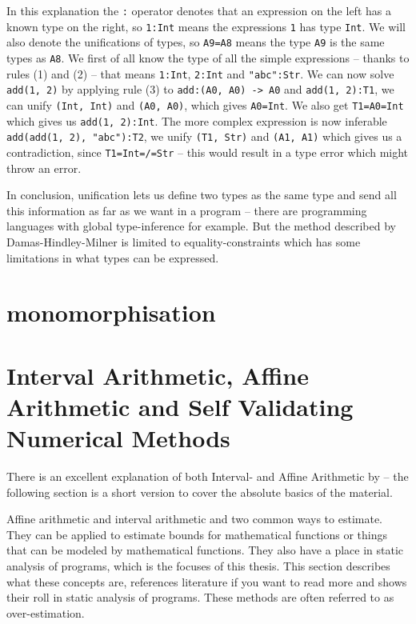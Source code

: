 In this explanation the \verb+:+ operator denotes that an expression on the left has a known type on the right, so \verb+1:Int+ means the expressions \verb+1+ has type \verb+Int+. We will also denote the unifications of types, so \verb+A9=A8+ means the type \verb+A9+ is the same types as \verb+A8+. We first of all know the type of all the simple expressions -- thanks to rules (1) and (2) -- that means \verb+1:Int+, \verb+2:Int+ and \verb+"abc":Str+. We can now solve \verb+add(1, 2)+ by applying rule (3) to \verb+add:(A0, A0) -> A0+ and \verb+add(1, 2):T1+, we can unify \verb+(Int, Int)+ and \verb+(A0, A0)+, which gives \verb+A0=Int+. We also get \verb+T1=A0=Int+ which gives us \verb+add(1, 2):Int+. The more complex expression is now inferable \verb+add(add(1, 2), "abc"):T2+, we unify \verb+(T1, Str)+ and \verb+(A1, A1)+ which gives us a contradiction, since \verb+T1=Int=/=Str+ -- this would result in a type error which might throw an error.

In conclusion, unification lets us define two types as the same type and send all this information as far as we want in a program -- there are programming languages with global type-inference for example. But the method described by Damas-Hindley-Milner is limited to equality-constraints which has some limitations in what types can be expressed.

\section{monomorphisation}

\section{Interval Arithmetic, Affine Arithmetic and Self Validating Numerical Methods}
\label{sec:IAndAA}

There is an excellent explanation of both Interval- and Affine Arithmetic by \citeauthor{src:affAri} -- the following section is a short version to cover the absolute basics of the material.

Affine arithmetic and interval arithmetic and two common ways to estimate. They can be applied to estimate bounds for mathematical functions or things that can be modeled by mathematical functions. They also have a place in static analysis of programs, which is the focuses of this thesis. This section describes what these concepts are, references literature if you want to read more and shows their roll in static analysis of programs. These methods are often referred to as over-estimation.

